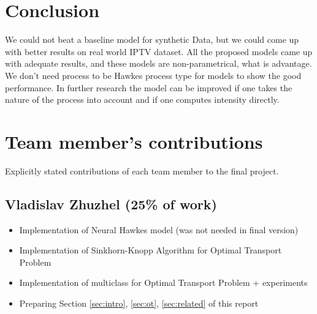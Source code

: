 \documentclass[10pt]{article}
\begin{document}


\section{Conclusion}\label{sec:conclusion}

We could not beat a baseline model for synthetic Data, but we could come up with better results on real world IPTV dataset. All the proposed models came up with adequate results, and these models are non-parametrical, what is advantage. We don't need process to be Hawkes process type for models to show the good performance. In further research the model can be improved if one takes the  nature of the process into account and if one computes intensity directly.





\newpage
\appendix
\section{Team member's contributions}
\label{appendix-contrib}
Explicitly stated contributions of each team member to the final project.
\subsection*{Vladislav Zhuzhel  (25\% of work)}
\begin{itemize}
    \item Implementation of Neural Hawkes model (was not needed in final version)
    \item Implementation of Sinkhorn-Knopp Algorithm for Optimal Transport Problem
    \item Implementation of multiclass for Optimal Transport Problem + experiments
    \item Preparing Section \ref{sec:intro}, \ref{sec:ot}, \ref{sec:related} of this report
\end{itemize}
\end{document}
